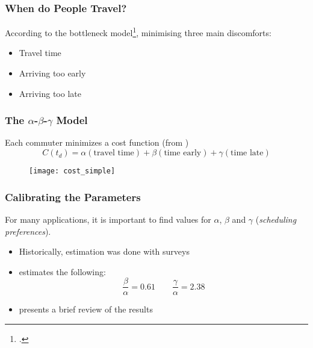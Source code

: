 \documentclass[hyperref={pdfpagelabels=false}]{beamer}
\begin{document}
\begin{frame}
  \frametitle{When do People Travel?}
  According to the bottleneck model\footcite{f32d6720-dd02-34b7-a4ba-c4c21193efe7, d0907f84-e14a-3d98-ad20-759f41491d6e},
  minimising three main discomforts:
  \begin{itemize}
  \item Travel time
  \item Arriving too early
  \item Arriving too late
  \end{itemize}

\end{frame}

\begin{frame}
  \frametitle{The \(\alpha\)-\(\beta\)-\(\gamma\) Model}
  Each commuter minimizes a cost function (from \cite{d0907f84-e14a-3d98-ad20-759f41491d6e})
  \begin{equation*}
    C(t_d) = \alpha(\text{travel time}) + \beta (\text{time early}) + \gamma (\text{time late})
  \end{equation*}
  \begin{figure}
    \centering
    \texttt{[image: cost\_simple]}
  \end{figure}
\end{frame}

\begin{frame}
  \frametitle{Calibrating the Parameters}
  For many applications, it is important to find values for \(\alpha\), \(\beta\) and \(\gamma\) (\textit{scheduling preferences}).
  \begin{itemize}
  \item<2-> Historically, estimation was done with surveys
  \item<3-> \textcite{54d203ee-4bf8-3234-9286-56e4c8b7f5bd} estimates the following:
    \begin{equation*}
      \frac{\beta}{\alpha} = 0.61\qquad \frac{\gamma}{\alpha} = 2.38
    \end{equation*}
  \item<4-> \textcite{https://doi.org/10.1111/iere.12692} presents a brief review of the results
  \end{itemize}
\end{frame}
\end{document}
